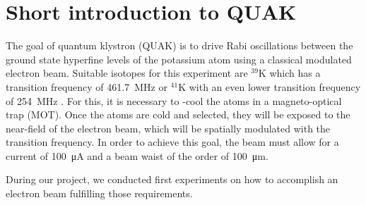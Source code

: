 
\chapter{Short introduction to QUAK}
\label{ch:Short introduction to QuaK}

The goal of quantum klystron (QUAK) is to drive Rabi oscillations between the ground state hyperfine levels of the potassium atom using a classical modulated electron beam. Suitable isotopes for this experiment are $^{39}\mathrm{K}$ which has a transition frequency of \SI{461.7}{\mega\hertz} or $^{41}\mathrm{K}$ with an even lower transition frequency of \SI{254}{\mega\hertz} \cite{tiecke:potassium-properties}. For this, it is necessary to -cool the atoms in a magneto-optical trap (MOT). Once the atoms are cold and selected, they will be exposed to the near-field of the electron beam, which will be spatially modulated with the transition frequency. In order to achieve this goal, the beam must allow for a current of \SI{100}{\micro\ampere} and a beam waist of the order of \SI{100}{\micro\meter}.

During our project, we conducted first experiments on how to accomplish an electron beam fulfilling those requirements.